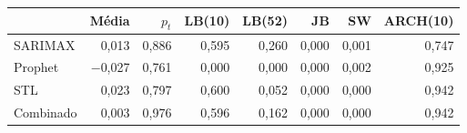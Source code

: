 \begin{tabular}{lrrrrrrr}
\toprule
 & Média & $p_t$ & LB(10) & LB(52) & JB & SW & ARCH(10) \\
\midrule
SARIMAX & 0,013 & 0,886 & 0,595 & 0,260 & 0,000 & 0,001 & 0,747 \\
Prophet & $-$0,027 & 0,761 & 0,000 & 0,000 & 0,000 & 0,002 & 0,925 \\
STL & 0,023 & 0,797 & 0,600 & 0,052 & 0,000 & 0,000 & 0,942 \\
Combinado & 0,003 & 0,976 & 0,596 & 0,162 & 0,000 & 0,000 & 0,942 \\
\bottomrule
\end{tabular}
